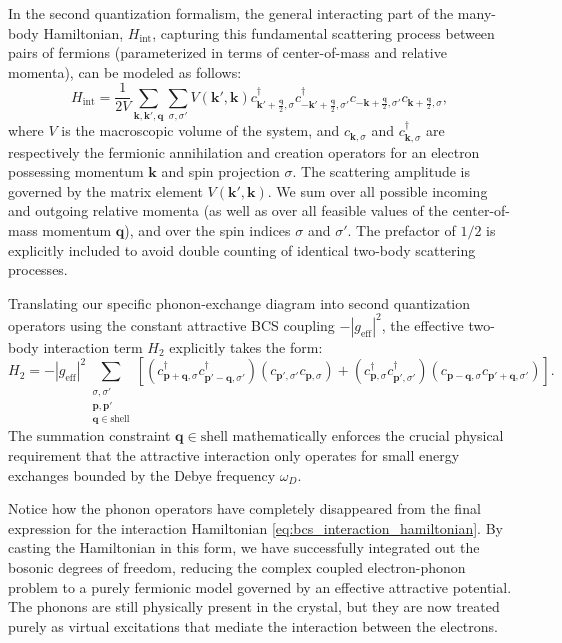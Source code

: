 In the second quantization formalism, the general interacting part of the many-body Hamiltonian, \( H_{\text{int}} \), capturing this fundamental scattering process between pairs of fermions (parameterized in terms of center-of-mass and relative momenta), can be modeled as follows:
\begin{equation} \label{eq:bcs_interaction_hamiltonian}
    H_{\text{int}} = \frac{1}{2V} \sum_{\mathbf{k}, \mathbf{k}', \mathbf{q}} \sum_{\sigma, \sigma'} V(\mathbf{k}', \mathbf{k}) c_{\mathbf{k}' + \frac{\mathbf{q}}{2}, \sigma}^\dagger c_{-\mathbf{k}' + \frac{\mathbf{q}}{2}, \sigma'}^\dagger c_{-\mathbf{k} + \frac{\mathbf{q}}{2}, \sigma'} c_{\mathbf{k} + \frac{\mathbf{q}}{2}, \sigma},
\end{equation}
where \( V \) is the macroscopic volume of the system, and \( c_{\mathbf{k}, \sigma} \) and \( c_{\mathbf{k}, \sigma}^\dagger \) are respectively the fermionic annihilation and creation operators for an electron possessing momentum \( \mathbf{k} \) and spin projection \( \sigma \). The scattering amplitude is governed by the matrix element \( V(\mathbf{k}', \mathbf{k}) \). We sum over all possible incoming and outgoing relative momenta (as well as over all feasible values of the center-of-mass momentum \( \mathbf{q} \)), and over the spin indices \( \sigma \) and \( \sigma' \). The prefactor of \( 1/2 \) is explicitly included to avoid double counting of identical two-body scattering processes.

Translating our specific phonon-exchange diagram into second quantization operators using the constant attractive BCS coupling \( -|g_{\text{eff}}|^2 \), the effective two-body interaction term \( H_2 \) explicitly takes the form:
\[
    H_2 = -|g_{\text{eff}}|^2 \sum_{\substack{\sigma, \sigma' \\ \mathbf{p}, \mathbf{p}' \\ \mathbf{q} \in \text{shell}}} \left[ \left( c_{\mathbf{p}+\mathbf{q}, \sigma}^\dagger c_{\mathbf{p}'-\mathbf{q}, \sigma'}^\dagger \right) \left( c_{\mathbf{p}', \sigma'} c_{\mathbf{p}, \sigma} \right) + \left( c_{\mathbf{p}, \sigma}^\dagger c_{\mathbf{p}', \sigma'}^\dagger \right) \left( c_{\mathbf{p}-\mathbf{q}, \sigma} c_{\mathbf{p}'+\mathbf{q}, \sigma'} \right) \right].
\]
The summation constraint \( \mathbf{q} \in \text{shell} \) mathematically enforces the crucial physical requirement that the attractive interaction only operates for small energy exchanges bounded by the Debye frequency \( \omega_D \).

Notice how the phonon operators have completely disappeared from the final expression for the interaction Hamiltonian \eqref{eq:bcs_interaction_hamiltonian}. By casting the Hamiltonian in this form, we have successfully integrated out the bosonic degrees of freedom, reducing the complex coupled electron-phonon problem to a purely fermionic model governed by an effective attractive potential. The phonons are still physically present in the crystal, but they are now treated purely as virtual excitations that mediate the interaction between the electrons.

